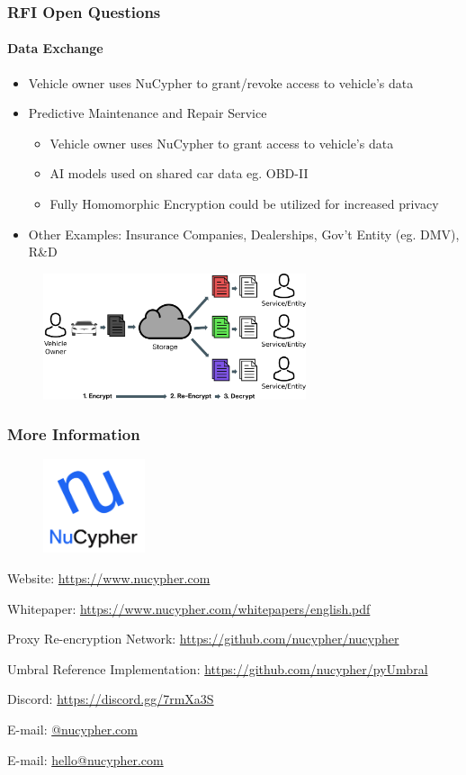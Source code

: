 \documentclass[xetex,mathsans,sans,aspectratio=169]{beamer}
\begin{document}
    \begin{frame}
      \frametitle{RFI Open Questions}
      \framesubtitle{Data Exchange}
      \begin{itemize}
        \setlength\itemsep{0.7em}
        \item Vehicle owner uses NuCypher to grant/revoke access to vehicle's data
        \item Predictive Maintenance and Repair Service
        \begin{itemize}
          \item Vehicle owner uses NuCypher to grant access to vehicle's data
          \item AI models used on shared car data eg. OBD-II
          \item Fully Homomorphic Encryption could be utilized for increased privacy
        \end{itemize}
        \item Other Examples: Insurance Companies, Dealerships, Gov't Entity (eg. DMV), R\&D
      \end{itemize}
      \begin{figure}
        \centering
        \includegraphics[height=3.7cm]{pdf/car-data-sharing-alternative.pdf}
      \end{figure}
    \end{frame}

    \begin{frame}
        \frametitle{More Information}
        \begin{figure}
            \centering
            \includegraphics[width=3cm]{pdf/nucypher_logo.pdf}
        \end{figure}
        Website: \url{https://www.nucypher.com}

        Whitepaper: \url{https://www.nucypher.com/whitepapers/english.pdf}

        Proxy Re-encryption Network: \url{https://github.com/nucypher/nucypher}

        Umbral Reference Implementation: \url{https://github.com/nucypher/pyUmbral}

        Discord: \url{https://discord.gg/7rmXa3S}

        E-mail: \href{mailto:\emailname @nucypher.com}{\emailname @nucypher.com}

        E-mail: \href{mailto:hello@nucypher.com}{hello@nucypher.com}
    \end{frame}
\end{document}
